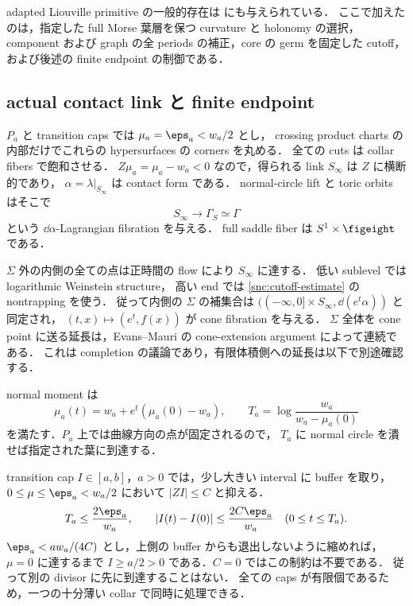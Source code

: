 adapted Liouville primitive の一般的存在は
\cite[Proposition 2.10]{BSV}にも与えられている．
ここで加えたのは，指定した full Morse 葉層を保つ curvature と holonomy の選択，
component および graph の全 periods の補正，core の germ を固定した cutoff，
および後述の finite endpoint の制御である．

\subsection{actual contact link と finite endpoint}

$P_a$ と transition caps では $\mu_a=\eps_a<w_a/2$ とし，
crossing product charts の内部だけでこれらの hypersurfaces の corners を丸める．
全ての cuts は collar fibers で飽和させる．
$Z\mu_a=\mu_a-w_a<0$ なので，得られる link $S_\infty$ は $Z$ に横断的であり，
$\alpha=\lambda|_{S_\infty}$ は contact form である．
normal-circle lift と toric orbits はそこで
\[
 S_\infty\longrightarrow\Gamma_S\simeq\Gamma
\]
という $\dd\alpha$-Lagrangian fibration を与える．
full saddle fiber は $S^1\times\figeight$ である．

$\Sigma$ 外の内側の全ての点は正時間の flow により $S_\infty$ に達する．
低い sublevel では logarithmic Weinstein structure，
高い end では \eqref{snc:cutoff-estimate} の nontrapping を使う．
従って内側の $\Sigma$ の補集合は
$((-\infty,0]\times S_\infty,\dd(e^t\alpha))$ と同定され，
$(t,x)\mapsto(e^t,f(x))$ が cone fibration を与える．
$\Sigma$ 全体を cone point に送る延長は，Evans--Mauri の cone-extension argument
\cite[Lemma 2.16]{EM}によって連続である．
これは completion の議論であり，有限体積側への延長は以下で別途確認する．

normal moment は
\begin{equation}\label{snc:time}
 \mu_a(t)=w_a+e^t(\mu_a(0)-w_a),\qquad
 T_a=\log\frac{w_a}{w_a-\mu_a(0)}
\end{equation}
を満たす．$P_a$ 上では曲線方向の点が固定されるので，
$T_a$ に normal circle を潰せば指定された葉に到達する．

transition cap $I\in[a,b]$，$a>0$ では，少し大きい interval に buffer を取り，
$0\leq\mu\leq\eps_a<w_a/2$ において $|ZI|\leq C$ と抑える．
\[
 T_a\leq\frac{2\eps_a}{w_a},\qquad
 |I(t)-I(0)|\leq\frac{2C\eps_a}{w_a}\quad(0\leq t\leq T_a).
\]
$\eps_a<a w_a/(4C)$ とし，上側の buffer からも退出しないように縮めれば，
$\mu=0$ に達するまで $I\geq a/2>0$ である．$C=0$ ではこの制約は不要である．
従って別の divisor に先に到達することはない．
全ての caps が有限個であるため，一つの十分薄い collar で同時に処理できる．

